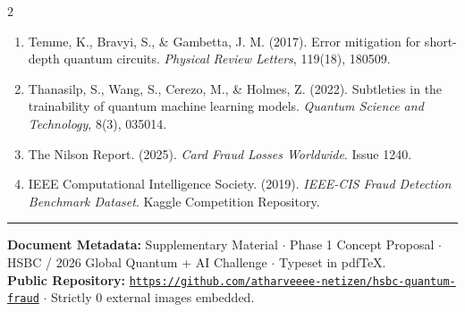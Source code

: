 \documentclass[10pt,a4paper]{article}
\begin{document}
\begin{multicols}{2}
\begin{enumerate}[leftmargin=*,itemsep=0.2pt,topsep=0.5pt]
\item Temme, K., Bravyi, S., \& Gambetta, J. M. (2017). Error mitigation for short-depth quantum circuits. \textit{Physical Review Letters}, 119(18), 180509.
\item Thanasilp, S., Wang, S., Cerezo, M., \& Holmes, Z. (2022). Subtleties in the trainability of quantum machine learning models. \textit{Quantum Science and Technology}, 8(3), 035014.
\item The Nilson Report. (2025). \textit{Card Fraud Losses Worldwide}. Issue 1240.
\item IEEE Computational Intelligence Society. (2019). \textit{IEEE-CIS Fraud Detection Benchmark Dataset}. Kaggle Competition Repository.
\end{enumerate}
\end{multicols}

\vspace{1pt}
\noindent\rule{\linewidth}{0.4pt}
\vspace{1.5pt}
{\footnotesize\color{darkslate}
\textbf{Document Metadata:} Supplementary Material $\cdot$ Phase 1 Concept Proposal $\cdot$ HSBC / 2026 Global Quantum + AI Challenge $\cdot$ Typeset in pdf\TeX.\\
\textbf{Public Repository:} \href{https://github.com/atharveeee-netizen/hsbc-quantum-fraud}{\texttt{https://github.com/atharveeee-netizen/hsbc-quantum-fraud}} $\cdot$ Strictly 0 external images embedded.
}
\end{document}
